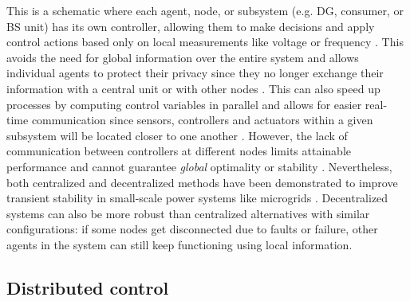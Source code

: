 \documentclass[final,3p,times]{elsarticle}
\begin{document}
This is a schematic where each agent, node, or subsystem (e.g. DG, consumer, or BS unit) has its own controller, allowing them to make decisions and apply control actions based only on local measurements like voltage or frequency \cite{pourbabak2017}. This avoids the need for global information over the entire system and allows individual agents to protect their privacy since they no longer exchange their information with a central unit or with other nodes \cite{gan2012}. This can also speed up processes by computing control variables in parallel and allows for easier real-time communication since sensors, controllers and actuators within a given subsystem will be located closer to one another \cite{farina2012}. However, the lack of communication between controllers at different nodes limits attainable performance and cannot guarantee \textit{global} optimality or stability \cite{pourbabak2017}. Nevertheless, both centralized and decentralized methods have been demonstrated to improve transient stability in small-scale power systems like microgrids \cite{senjyu2005}. Decentralized systems can also be more robust than centralized alternatives with similar configurations: if some nodes get disconnected due to faults or failure, other agents in the system can still keep functioning using local information.

\subsection{Distributed control}
\end{document}
